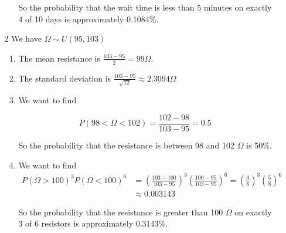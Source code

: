 \documentclass[12pt,letterpaper]{article}
\begin{document}
\begin{enumerate}
\begin{enumerate}
\begin{enumerate}[label=(\arabic*)]
              So the probability that the wait time is less than 5 minutes on exactly 4 of 10 days is approximately 0.1084\%.
          \end{enumerate}
        \item [2]
          We have $\Omega \sim U(95, 103)$
          \begin{enumerate}[label=(\arabic*)]
            \item
              The mean resistance is $\frac{103 - 95}{2} = 99 \Omega$.
            \item
              The standard deviation is $\frac{103 - 95}{\sqrt{12}} \approx 2.3094 \Omega$
            \item
              We want to find

              \[
                P(98 < \Omega < 102) = \frac{102 - 98}{103 - 95} = 0.5
              \]

              So the probability that the resistance is between 98 and 102 $\Omega$ is 50\%.
            \item
              We want to find
              \begin{align*}
                P(\Omega > 100)^3 P(\Omega < 100)^6 &= \left(\frac{103 - 100}{103 - 95}\right)^3 \left(\frac{100 - 95}{103 - 95}\right)^6 = \left(\frac{3}{8}\right)^3 \left(\frac{5}{8}\right)^6 \\
                &\approx 0.003143
              \end{align*}

              So the probability that the resistance is greater than 100 $\Omega$ on exactly 3 of 6 resistors is approximately 0.3143\%.
          \end{enumerate}
      \end{enumerate}
  \end{enumerate}
\end{document}
